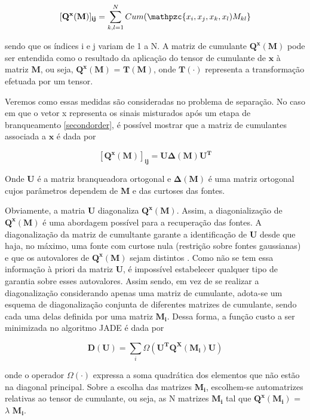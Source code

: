     \begin{equation}
        \mathbf{[Q^x(M)]_{ij}} = \sum_{k,l=1}^N Cum(\mathpzc{x_i,x_j,x_k,x_l)M_{kl}}
    \end{equation}
    
    sendo que os índices i e j variam de 1 a N. A matriz de cumulante $\mathbf{Q^x(M)}$ pode ser entendida como o resultado da aplicação do tensor de cumulante de $\mathbf{x}$ à matriz $\mathbf{M}$, ou seja, $\mathbf{Q^x(M)}$ = $\mathbf{T(M)}$, onde $\mathbf{T(\cdot)}$ representa a transformação efetuada por um tensor.
    
    Veremos como essas medidas são consideradas no problema de separação. No caso em que o vetor x representa os sinais misturados após um etapa de branqueamento \ref{secondorder}, é possível mostrar \cite{ICA3} que a matriz de cumulantes associada a $\mathbf{x}$ é dada por
    
    \begin{equation}
        \mathbf{[Q^x(M)]_{ij}} = \mathbf{U\Delta(M)U^T}
    \end{equation}
    
    Onde $\mathbf{U}$ é a matriz branqueadora ortogonal e  $\mathbf{\Delta(M)}$ é uma matriz ortogonal cujos parâmetros dependem de $\mathbf{M}$ e das curtoses das fontes.

    Obviamente, a matria $\mathbf{U}$ diagonaliza  $\mathbf{Q^x(M)}$. Assim, a diagonialização de $\mathbf{Q^x(M)}$ é uma abordagem possível para a recuperação das fontes.  A diagonalização da matriz de cumultante garante a identificação de $\mathbf{U}$ desde que haja, no máximo, uma fonte com curtose nula (restrição sobre fontes gaussianas) e que os autovalores de $\mathbf{Q^x(M)}$ sejam distintos \cite{JADE}. Como não se tem essa informação à priori da matriz $\mathbf{U}$, é impossível estabelecer qualquer tipo de garantia sobre esses autovalores.
    Assim sendo, em vez de se realizar a diagonalização considerando apenas uma matriz de cumulante, adota-se um esquema de diagonalização conjunta de diferentes matrizes de cumulante, sendo cada uma delas definida por uma matriz $\mathbf{M_i}$. Dessa forma, a função custo a ser minimizada no algoritmo JADE é dada por
    
    \begin{equation}\label{eq:optimize}
        \mathbf{D(U)} = \sum_i \Omega(\mathbf{U^TQ^X(M_i)U})
    \end{equation}
    
    onde o operador $\Omega(\cdot)$ expressa a soma quadrática dos elementos que não estão na diagonal principal. Sobre a escolha das matrizes $\mathbf{M_i}$, escolhem-se automatrizes relativas ao tensor de cumulante, ou seja, as N matrizes $\mathbf{M_i}$ tal que $\mathbf{Q^x(M_i)}$ = $\lambda$ $\mathbf{M_i}$.
    
